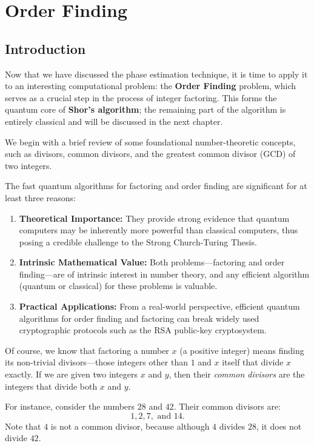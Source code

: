 \chapter{Order Finding}
\section{Introduction}

Now that we have discussed the phase estimation technique, it is time to apply it to an interesting computational problem: the \textbf{Order Finding} problem, which serves as a crucial step in the process of integer factoring. This forms the quantum core of \textbf{Shor's algorithm}; the remaining part of the algorithm is entirely classical and will be discussed in the next chapter.

We begin with a brief review of some foundational number-theoretic concepts, such as divisors, common divisors, and the greatest common divisor (GCD) of two integers.

The fast quantum algorithms for factoring and order finding are significant for at least three reasons:
\begin{enumerate}
    \item \textbf{Theoretical Importance:} They provide strong evidence that quantum computers may be inherently more powerful than classical computers, thus posing a credible challenge to the Strong Church-Turing Thesis.
    \item \textbf{Intrinsic Mathematical Value:} Both problems—factoring and order finding—are of intrinsic interest in number theory, and any efficient algorithm (quantum or classical) for these problems is valuable.
    \item \textbf{Practical Applications:} From a real-world perspective, efficient quantum algorithms for order finding and factoring can break widely used cryptographic protocols such as the RSA public-key cryptosystem.
\end{enumerate}

Of course, we know that factoring a number $x$ (a positive integer) means finding its non-trivial divisors—those integers other than $1$ and $x$ itself that divide $x$ exactly. If we are given two integers $x$ and $y$, then their \textit{common divisors} are the integers that divide both $x$ and $y$.

\begin{example}
For instance, consider the numbers $28$ and $42$. Their common divisors are:
\[
1, 2, 7, \text{ and } 14.
\]
Note that $4$ is not a common divisor, because although $4$ divides $28$, it does not divide $42$.
\end{example}


